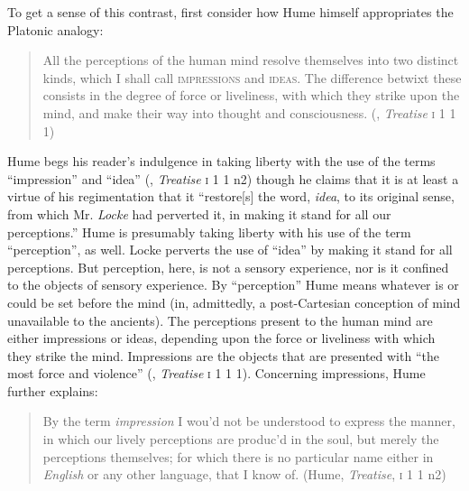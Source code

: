 To get a sense of this contrast, first consider how Hume himself appropriates the Platonic analogy:
\begin{quote}
	All the perceptions of the human mind resolve themselves into two distinct kinds, which I shall call \textsc{impressions} and \textsc{ideas}. The difference betwixt these consists in the degree of force or liveliness, with which they strike upon the mind, and make their way into thought and consciousness. (\citealt{Hume:1739kx}, \emph{Treatise} \textsc{i} 1 1 1)
\end{quote}
Hume begs his reader's indulgence in taking liberty with the use of the terms ``impression'' and ``idea'' (\citealt{Hume:1739kx}, \emph{Treatise} \textsc{i} 1 1 n2) though he claims that it is at least a virtue of his regimentation that it ``restore[s] the word, \emph{idea}, to its original sense, from which Mr. \emph{Locke} had perverted it, in making it stand for all our perceptions.'' Hume is presumably taking liberty with his use of the term ``perception'', as well. Locke perverts the use of ``idea'' by making it stand for all perceptions. But perception, here, is not a sensory experience, nor is it confined to the objects of sensory experience. By ``perception'' Hume means whatever is or could be set before the mind (in, admittedly, a post-Cartesian conception of mind unavailable to the ancients). The perceptions present to the human mind are either impressions or ideas, depending upon the force or liveliness with which they strike the mind. Impressions are the objects that are presented with ``the most force and violence'' (\citealt{Hume:1739kx}, \emph{Treatise} \textsc{i} 1 1 1).  Concerning impressions, Hume further explains:
\begin{quote}
	By the term \emph{impression} I wou'd not be understood to express the manner, in which our lively perceptions are produc'd in the soul, but merely the perceptions themselves; for which there is no particular name either in \emph{English} or any other language, that I know of. (Hume, \emph{Treatise}, \textsc{i} 1 1 n2)
\end{quote}
